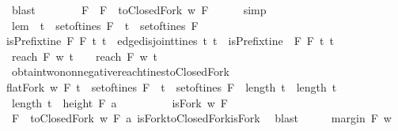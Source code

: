 \begin{isabellebody}
\ blast\ \ \ \ \isanewline
\ \ \isamarkupfalse%
\ F{\isacharprime}\ \ {\isachardoublequoteopen}F{\isacharprime}\ {\isacharequal}\ toClosedFork\ w\ F{\isachardoublequoteclose}\isanewline
\ \ \ \ \isamarkupfalse%
\ simp\isanewline
\ \ \isamarkupfalse%
\ \isamarkupfalse%
\ lem{}{\isacharcolon}\ {\isachardoublequoteopen}{\isacharparenleft}{\isasymexists}\ t{}{\isacharprime}\ {\isasymin}\ set{\isacharunderscore}of{\isacharunderscore}tines\ F{\isacharprime}{\isachardot}\ {\isasymexists}\ t{}{\isacharprime}\ {\isasymin}\ set{\isacharunderscore}of{\isacharunderscore}tines\ F{\isacharprime}{\isachardot}\ \isanewline
isPrefix{\isacharunderscore}tine\ F{\isacharprime}\ F\ t{}{\isacharprime}\ t{}\ {\isasymand}\ edge{\isacharunderscore}disjoint{\isacharunderscore}tines\ t{}{\isacharprime}\ t{}{\isacharprime}\ {\isasymand}\ isPrefix{\isacharunderscore}tine\ \ F{\isacharprime}\ F\ t{}{\isacharprime}\ t{}\ \isanewline
{\isasymand}\ reach\ F{\isacharprime}\ w\ t{}{\isacharprime}\ {\isasymge}\ {}\ {\isasymand}\ reach\ F{\isacharprime}\ w\ t{}{\isacharprime}\ {\isasymge}\ {}{\isacharparenright}{\isachardoublequoteclose}\ \isanewline
\ \ \ \ \isamarkupfalse%
\ obtain{\isacharunderscore}two{\isacharunderscore}non{\isacharunderscore}negative{\isacharunderscore}reach{\isacharunderscore}tines{\isacharunderscore}toClosedFork\isanewline
{\isacartoucheopen}flatFork\ w\ F{\isacartoucheclose}\ {\isacartoucheopen}t{}\ {\isasymin}\ set{\isacharunderscore}of{\isacharunderscore}tines\ F\ {\isasymand}\ t{}\ {\isasymin}\ set{\isacharunderscore}of{\isacharunderscore}tines\ F\ {\isasymand}\ length\ t{}\ {\isacharequal}\ length\ t{}\ \isanewline
{\isasymand}\ length\ t{}\ {\isacharequal}\ height\ F{\isacartoucheclose}\ a\ \isanewline
\ \ \ \ \isamarkupfalse%
\isanewline
\ \ \isamarkupfalse%
\ {\isachardoublequoteopen}isFork\ w\ F{\isacharprime}{\isachardoublequoteclose}\isanewline
\ \ \ \ \isamarkupfalse%
\ {\isacartoucheopen}F{\isacharprime}\ {\isacharequal}\ toClosedFork\ w\ F{\isacartoucheclose}\ a\ isFork{\isacharunderscore}toClosedFork{\isacharunderscore}isFork\ \isamarkupfalse%
\ blast\isanewline
\ \ \isamarkupfalse%
\ \isamarkupfalse%
\ {\isachardoublequoteopen}margin\ F{\isacharprime}\ w\ {\isasymge}\ {}{\isachardoublequoteclose}\isanewline

\end{isabellebody}
